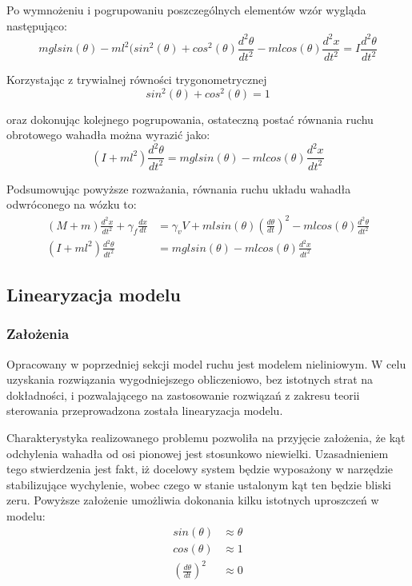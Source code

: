 \documentclass[12pt, oneside]{report}
\theoremstyle{definition}
\begin{document}
Po wymnożeniu i pogrupowaniu poszczególnych elementów wzór wygląda następująco:
\begin{equation}
mglsin(\theta) - ml^2(sin^2(\theta) + cos^2(\theta) \frac{d^2\theta}{dt^2} - mlcos(\theta) \frac{d^2x}{dt^2} = I\frac{d^2\theta}{dt^2}
\end{equation}

Korzystając z trywialnej równości trygonometrycznej
\begin{equation}
sin^2(\theta) + cos^2(\theta) = 1
\end{equation}

oraz dokonując kolejnego pogrupowania, ostateczną postać równania ruchu obrotowego wahadła można wyrazić jako:
\begin{equation}
(I + ml^2)\frac{d^2\theta}{dt^2} = mglsin(\theta) - mlcos(\theta)\frac{d^2x}{dt^2}
\end{equation}

Podsumowując powyższe rozważania, równania ruchu układu wahadła odwróconego na wózku to:
\begin{equation} \label{Equations}
\begin{aligned}
(M + m) \frac{d^2x}{dt^2} + \gamma_f \frac{dx}{dt} &= \gamma_v V + mlsin(\theta)(\frac{d\theta}{dt})^2 - mlcos(\theta) \frac{d^2\theta}{dt^2}\\
(I + ml^2)\frac{d^2\theta}{dt^2} &= mglsin(\theta) - mlcos(\theta)\frac{d^2x}{dt^2}
\end{aligned}
\end{equation}

\subsection{Linearyzacja modelu}
\subsubsection{Założenia}
Opracowany w poprzedniej sekcji model ruchu jest modelem nieliniowym. W celu uzyskania rozwiązania wygodniejszego obliczeniowo, bez istotnych strat na dokładności, i pozwalającego na zastosowanie rozwiązań z zakresu teorii sterowania przeprowadzona została linearyzacja modelu. 

Charakterystyka realizowanego problemu pozwoliła na przyjęcie założenia, że kąt odchylenia wahadła od osi pionowej jest stosunkowo niewielki. Uzasadnieniem tego stwierdzenia jest fakt, iż docelowy system będzie wyposażony w narzędzie stabilizujące wychylenie, wobec czego w stanie ustalonym kąt ten będzie bliski zeru. Powyższe założenie umożliwia dokonania kilku istotnych uproszczeń w modelu:
\begin{equation}
\begin{aligned}
sin(\theta) &\approx \theta \\
cos(\theta) &\approx 1 \\
(\frac{d\theta}{dt})^2 &\approx 0
\end{aligned}
\end{equation}
\end{document}

